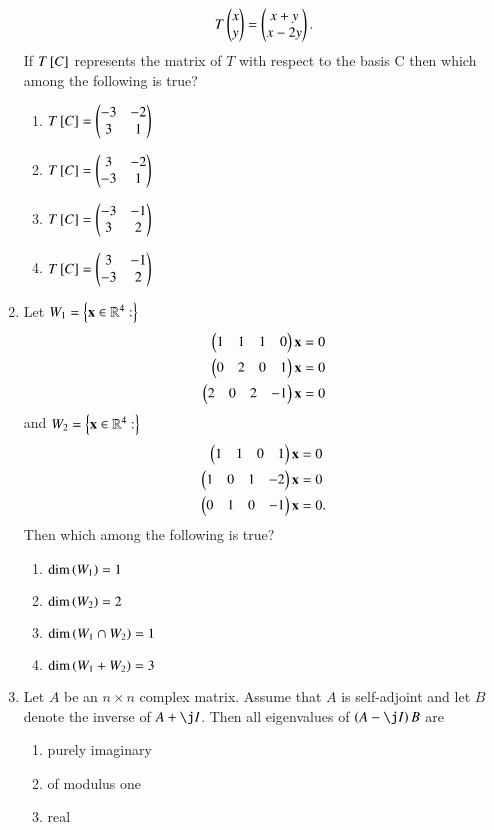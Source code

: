 \begin{enumerate}[label=\thesection.\arabic*.,ref=\thesection.\theenumi]
\begin{align}
T\begin{pmatrix}x\\y\end{pmatrix} = \begin{pmatrix}x+y \\ x-2y\end{pmatrix}.
\end{align}
If $T{}\left[C\right]$ represents the matrix of $T$ with respect to the basis C then
which among the following is true?
\begin{enumerate}
\item $T{}\left[C\right] = \begin{pmatrix}-3 & -2\\3 & 1\end{pmatrix}$
\item $T{}\left[C\right] = \begin{pmatrix}3 & -2\\-3 & 1\end{pmatrix}$
\item $T{}\left[C\right] = \begin{pmatrix}-3 & -1\\3 & 2\end{pmatrix}$
\item $T{}\left[C\right] = \begin{pmatrix}3 & -1\\-3 & 2\end{pmatrix}$
\end{enumerate}
\solution

\item Let $W_1 = \left\{\mathbf{x} \in \mathbb{R}^4:\right\}$
\begin{align}
 \begin{pmatrix}1 & 1 & 1 & 0\end{pmatrix}\mathbf{x} = 0
\\
 \begin{pmatrix}0 & 2 & 0 & 1\end{pmatrix}\mathbf{x} = 0
\\
 \begin{pmatrix}2 & 0 & 2 & -1\end{pmatrix}\mathbf{x} = 0
\end{align}
and
$W_2 = \left\{\mathbf{x} \in \mathbb{R}^4:\right\}$
\begin{align}
 \begin{pmatrix}1 & 1 & 0 & 1\end{pmatrix}\mathbf{x} &= 0
\\
 \begin{pmatrix}1 & 0 & 1 & -2\end{pmatrix}\mathbf{x} &= 0
\\
 \begin{pmatrix}0 & 1 & 0 & -1\end{pmatrix}\mathbf{x} &= 0.
\end{align}
Then which among the following is true?
\begin{enumerate}
\item $\text{dim}\left(W_1\right) = 1$
\item $\text{dim}\left(W_2\right) = 2$
\item $\text{dim}\left(W_1 \cap W_2\right) = 1$
\item $\text{dim}\left(W_1+W_2\right) = 3$
\end{enumerate}
%
\item Let $A$ be an $n \times n$ complex matrix.  Assume that $A$ is self-adjoint and let $B$ denote the inverse of $A + \j I$. Then all eigenvalues of $\brak{A-\j I}B$ are 
\begin{enumerate}
\item purely imaginary
\item of modulus one
\item real

\end{enumerate}
\end{enumerate}
